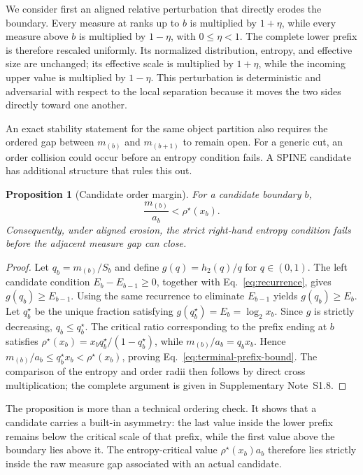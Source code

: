 \documentclass[aip,cha,reprint,superscriptaddress,floatfix]{revtex4-2}
\newtheorem{proposition}[theorem]{Proposition}
\theoremstyle{definition}
\theoremstyle{remark}
\newcommand{\rhostar}{\rho^{\star}}
\begin{document}
We consider first an aligned relative perturbation that directly erodes the boundary. Every measure at ranks up to \(b\) is multiplied by \(1+\eta\), while every measure above \(b\) is multiplied by \(1-\eta\), with \(0\le\eta<1\). The complete lower prefix is therefore rescaled uniformly. Its normalized distribution, entropy, and effective size are unchanged; its effective scale is multiplied by \(1+\eta\), while the incoming upper value is multiplied by \(1-\eta\). This perturbation is deterministic and adversarial with respect to the local separation because it moves the two sides directly toward one another.

An exact stability statement for the same object partition also requires the ordered gap between \(m_{(b)}\) and \(m_{(b+1)}\) to remain open. For a generic cut, an order collision could occur before an entropy condition fails. A SPINE candidate has additional structure that rules this out.

\begin{proposition}[Candidate order margin]
\label{prop:order-margin}
For a candidate boundary \(b\),
\begin{equation}
\frac{m_{(b)}}{a_b}<\rhostar(x_b).
\label{eq:terminal-prefix-bound}
\end{equation}
Consequently, under aligned erosion, the strict right-hand entropy condition fails before the adjacent measure gap can close.
\end{proposition}

\begin{proof}
Let \(q_b=m_{(b)}/S_b\) and define \(g(q)=h_2(q)/q\) for \(q\in(0,1)\). The left candidate condition \(E_b-E_{b-1}\ge0\), together with Eq.~\eqref{eq:recurrence}, gives \(g(q_b)\ge E_{b-1}\). Using the same recurrence to eliminate \(E_{b-1}\) yields \(g(q_b)\ge E_b\). Let \(q_b^\star\) be the unique fraction satisfying \(g(q_b^\star)=E_b=\log_2x_b\). Since \(g\) is strictly decreasing, \(q_b\le q_b^\star\). The critical ratio corresponding to the prefix ending at \(b\) satisfies \(\rhostar(x_b)=x_bq_b^\star/(1-q_b^\star)\), while \(m_{(b)}/a_b=q_bx_b\). Hence \(m_{(b)}/a_b\le q_b^\star x_b<\rhostar(x_b)\), proving Eq.~\eqref{eq:terminal-prefix-bound}. The comparison of the entropy and order radii then follows by direct cross multiplication; the complete argument is given in Supplementary Note~S1.8.
\end{proof}

The proposition is more than a technical ordering check. It shows that a candidate carries a built-in asymmetry: the last value inside the lower prefix remains below the critical scale of that prefix, while the first value above the boundary lies above it. The entropy-critical value \(\rhostar(x_b)a_b\) therefore lies strictly inside the raw measure gap associated with an actual candidate.
\end{document}
